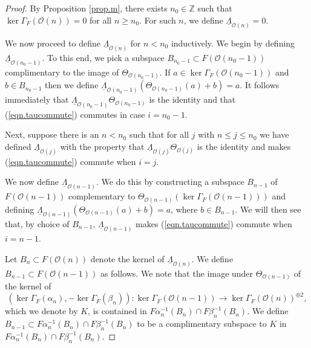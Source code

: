 \documentclass[10pt]{amsart}
\theoremstyle{definition}
\theoremstyle{remark}
\numberwithin{equation}{section}
\begin{document}
\begin{proof}
By Proposition \ref{prop.m}, there exists $n_{0} \in \mathbb{Z}$ such that ${\operatorname{ker }\Gamma_{F}} (\mathcal{O}(n)) = 0$ for all $n \geq n_{0}$.  For such $n$, we define $\underline{\Lambda}_{\mathcal{O}(n)}=0$.

We now proceed to define $\underline{\Lambda}_{\mathcal{O}(n)}$ for $n<n_{0}$ inductively.  We begin by defining $\underline{\Lambda}_{\mathcal{O}(n_{0}-1)}$.  To this end, we pick a subspace $B_{n_{0}-1} \subset F(\mathcal{O}(n_{0}-1))$ complimentary to the image of $\Theta_{\mathcal{O}(n_{0}-1)}$.  If $a \in {\operatorname{ker }\Gamma_{F}}(\mathcal{O}(n_{0}-1))$ and $b \in B_{n_{0}-1}$ then we define $\underline{\Lambda}_{\mathcal{O}(n_{0}-1)}(\Theta_{\mathcal{O}(n_{0}-1)}(a)+b)=a$.  It follows immediately that $\underline{\Lambda}_{\mathcal{O}(n_{0}-1)} \Theta_{\mathcal{O}(n_{0}-1)}$ is the identity and that (\ref{eqn.taucommute}) commutes in case $i=n_{0}-1$.

Next, suppose there is an $n<n_{0}$ such that for all $j$ with $n \leq j \leq n_{0}$ we have defined $\underline{\Lambda}_{\mathcal{O}(j)}$ with the property that $\underline{\Lambda}_{\mathcal{O}(j)} \Theta_{\mathcal{O}(j)}$ is the identity and makes (\ref{eqn.taucommute}) commute when $i=j$.

We now define $\underline{\Lambda}_{\mathcal{O}(n-1)}$.  We do this by constructing a subspace $B_{n-1}$ of $F(\mathcal{O}(n-1))$ complementary to $\Theta_{\mathcal{O}(n-1)}({\operatorname{ker }\Gamma_{F}} (\mathcal{O}(n-1)))$ and defining $\underline{\Lambda}_{\mathcal{O}(n-1)}(\Theta_{\mathcal{O}(n-1)}(a)+b)=a$, where $b \in B_{n-1}$.  We will then see that, by choice of $B_{n-1}$, $\underline{\Lambda}_{\mathcal{O}(n-1)}$ makes (\ref{eqn.taucommute}) commute when $i=n-1$.

Let $B_{n} \subset F(\mathcal{O}(n))$ denote the kernel of $\underline{\Lambda}_{\mathcal{O}(n)}$.  We define $B_{n-1} \subset F(\mathcal{O}(n-1))$ as follows.  We note that the image under $\Theta_{\mathcal{O}(n-1)}$ of the kernel of
$$
({\operatorname{ker }\Gamma_{F}} (\alpha_{n}),-{\operatorname{ker }\Gamma_{F}} (\beta_{n})):{\operatorname{ker }\Gamma_{F}} (\mathcal{O}(n-1)) \rightarrow {\operatorname{ker }\Gamma_{F}} (\mathcal{O}(n))^{\oplus 2},
$$
which we denote by $K$, is contained in $F\alpha_{n}^{-1}(B_{n}) \cap F\beta_{n}^{-1}(B_{n})$.  We define $B_{n-1} \subset F\alpha_{n}^{-1}(B_{n}) \cap F\beta_{n}^{-1}(B_{n})$ to be a complimentary subspace to $K$ in $F\alpha_{n}^{-1}(B_{n}) \cap F\beta_{n}^{-1}(B_{n})$.


\end{proof}
\end{document}
